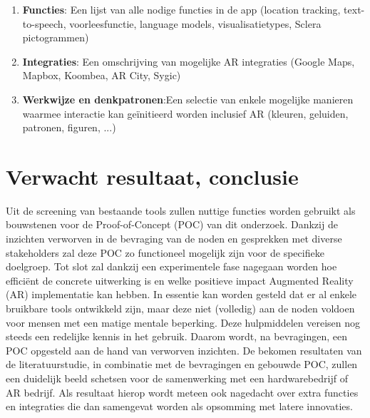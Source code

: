 \begin{enumerate}
    \item \textbf{Functies}: Een lijst van alle nodige functies in de app (location tracking, text-to-speech, voorleesfunctie, language models, visualisatietypes, Sclera pictogrammen)
    \item \textbf{Integraties}: Een omschrijving van mogelijke AR integraties (Google Maps, Mapbox, Koombea, AR City, Sygic)
    \item \textbf{Werkwijze en denkpatronen}:Een selectie van enkele mogelijke manieren waarmee interactie kan geïnitieerd worden inclusief AR (kleuren, geluiden, patronen, figuren, ...)
\end{enumerate}


\section{Verwacht resultaat, conclusie}%
\label{sec:verwachte_resultaten}

Uit de screening van bestaande tools zullen nuttige functies worden gebruikt als bouwstenen voor de Proof-of-Concept (POC) van dit onderzoek. 
Dankzij de inzichten verworven in de bevraging van de noden en gesprekken met diverse stakeholders zal deze POC zo functioneel mogelijk zijn voor de specifieke doelgroep. 
Tot slot zal dankzij een experimentele fase nagegaan worden hoe efficiënt de concrete uitwerking is en welke positieve impact Augmented Reality (AR) implementatie kan hebben.
In essentie kan worden gesteld dat er al enkele bruikbare tools ontwikkeld zijn, maar deze niet (volledig) aan de noden voldoen voor mensen met een matige mentale beperking. Deze hulpmiddelen vereisen nog steeds een redelijke kennis in het gebruik. Daarom wordt, na bevragingen, een POC opgesteld aan de hand van verworven inzichten. De bekomen resultaten van de literatuurstudie, in combinatie met de bevragingen en gebouwde POC, zullen een duidelijk beeld schetsen voor de samenwerking met een hardwarebedrijf of AR bedrijf. 
Als resultaat hierop wordt meteen ook nagedacht over extra functies en integraties die dan samengevat worden als opsomming met latere innovaties.

